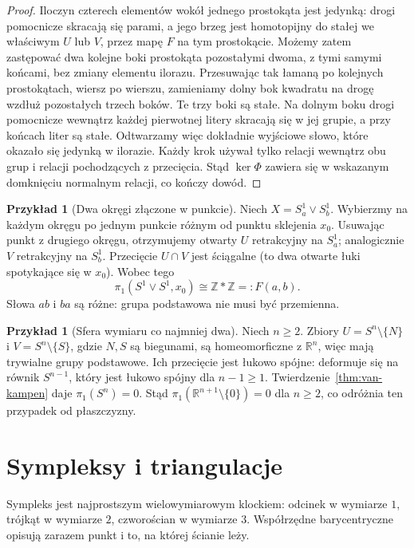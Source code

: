 \documentclass[11pt,a4paper,oneside]{report}
\newcommand{\R}{\mathbb{R}}
\newcommand{\Z}{\mathbb{Z}}
\theoremstyle{plain}
\theoremstyle{definition}
\newtheorem{przyklad}[twierdzenie]{Przykład}
\theoremstyle{remark}
\begin{document}
\begin{proof}
Iloczyn czterech elementów wokół jednego prostokąta jest jedynką:
drogi pomocnicze skracają się parami, a jego brzeg jest homotopijny
do stałej we właściwym $U$ lub $V$, przez mapę $F$ na tym prostokącie.
Możemy zatem zastępować dwa kolejne boki prostokąta pozostałymi
dwoma, z tymi samymi końcami, bez zmiany elementu ilorazu.
Przesuwając tak łamaną po kolejnych prostokątach, wiersz po wierszu,
zamieniamy dolny bok kwadratu na drogę wzdłuż pozostałych trzech boków.
Te trzy boki są stałe. Na dolnym boku drogi pomocnicze wewnątrz
każdej pierwotnej litery skracają się w jej grupie, a przy końcach
liter są stałe. Odtwarzamy więc dokładnie wyjściowe słowo,
które okazało się jedynką w ilorazie. Każdy krok używał tylko
relacji wewnątrz obu grup i relacji pochodzących z przecięcia.
Stąd $\ker\Phi$ zawiera się w
wskazanym domknięciu normalnym relacji, co kończy dowód.
\end{proof}

\begin{przyklad}[Dwa okręgi złączone w punkcie]
\label{prz:pi1-dwa-okregi}
Niech $X=S^1_a\vee S^1_b$.
Wybierzmy na każdym okręgu po jednym
punkcie różnym od punktu sklejenia
$x_0$. Usuwając punkt z drugiego
okręgu, otrzymujemy otwarty $U$
retrakcyjny na $S^1_a$; analogicznie
$V$ retrakcyjny na $S^1_b$.
Przecięcie $U\cap V$ jest ściągalne
(to dwa otwarte łuki spotykające się
w $x_0$). Wobec tego
\[
 \pi_1(S^1\vee S^1,x_0)
 \cong\Z*\Z=:F(a,b).
\]
Słowa $ab$ i $ba$ są różne:
grupa podstawowa nie musi być przemienna.
\end{przyklad}

\begin{przyklad}[Sfera wymiaru co najmniej dwa]
\label{prz:pi1-sfera}
Niech $n\geq2$. Zbiory
$U=S^n\setminus\{N\}$ i
$V=S^n\setminus\{S\}$, gdzie $N,S$
są biegunami, są homeomorficzne
z $\R^n$, więc mają trywialne
grupy podstawowe. Ich przecięcie
jest łukowo spójne: deformuje się
na równik $S^{n-1}$, który jest
łukowo spójny dla $n-1\geq1$.
Twierdzenie~\ref{thm:van-kampen}
daje $\pi_1(S^n)=0$.
Stąd $\pi_1(\R^{n+1}\setminus\{0\})=0$
dla $n\geq2$, co odróżnia ten
przypadek od płaszczyzny.
\end{przyklad}

\section{Sympleksy i triangulacje}
\label{sec:sympleksy}

Sympleks jest najprostszym wielowymiarowym
klockiem: odcinek w wymiarze $1$, trójkąt
w wymiarze $2$, czworościan w wymiarze $3$.
Współrzędne barycentryczne opisują
zarazem punkt i to, na której ścianie leży.
\end{document}
